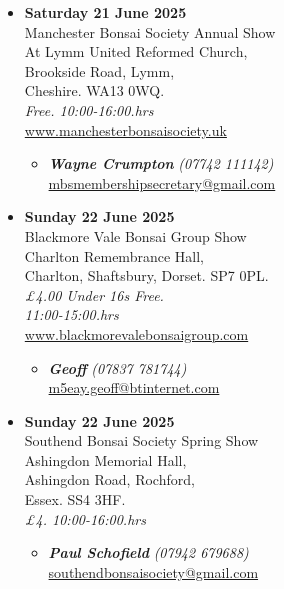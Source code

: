 \begin{itemize}
    \item \textbf{Saturday 21 June 2025}
    \\
    Manchester Bonsai Society Annual Show \\
    At Lymm United Reformed Church, \\
    Brookside Road, Lymm, \\
    Cheshire. WA13 0WQ.
    \\
    \emph{Free. 10:00-16:00.hrs}
    \\
    \href{https://www.manchesterbonsaisociety.uk}{www.manchesterbonsaisociety.uk}
    \begin{itemize}
        \item \textbf{\emph{Wayne Crumpton}} \emph{(07742 111142)} \\
        \href{mailto:mbsmembershipsecretary@gmail.com}{mbsmembershipsecretary@gmail.com} 
    \end{itemize}

    \item \textbf{Sunday 22 June 2025}
    \\
    Blackmore Vale Bonsai Group Show \\
    Charlton Remembrance Hall, \\
    Charlton, Shaftsbury, Dorset. SP7 0PL.
    \\
    \emph{£4.00 Under 16s Free.} \\
    \emph{11:00-15:00.hrs}
    \\
    \href{https://www.blackmorevalebonsaigroup.com}{www.blackmorevalebonsaigroup.com}
    \begin{itemize}
        \item \textbf{\emph{Geoff}} \emph{(07837 781744)} \\
        \href{mailto:m5eay.geoff@btinternet.com}{m5eay.geoff@btinternet.com} 
    \end{itemize}

    \item \textbf{Sunday 22 June 2025}
    \\
    Southend Bonsai Society Spring Show \\
    Ashingdon Memorial Hall, \\
    Ashingdon Road, Rochford, \\
    Essex. SS4 3HF.
    \\
    \emph{£4. 10:00-16:00.hrs}
    \begin{itemize}
        \item \textbf{\emph{Paul Schofield}} \emph{(07942 679688)} \\
        \href{mailto:southendbonsaisociety@gmail.com}{southendbonsaisociety@gmail.com} 
    \end{itemize}


\end{itemize}
